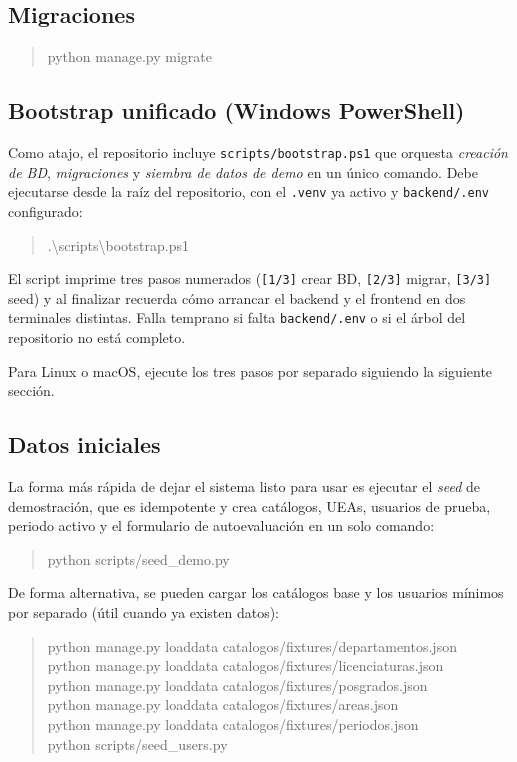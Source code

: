 \documentclass{computacion}
\begin{document}
\subsection{Migraciones}

\begin{quote}
\ttfamily
python manage.py migrate
\end{quote}

\subsection{Bootstrap unificado (Windows PowerShell)}

Como atajo, el repositorio incluye \texttt{scripts/bootstrap.ps1} que orquesta \emph{creación de BD}, \emph{migraciones} y \emph{siembra de datos de demo} en un único comando. Debe ejecutarse desde la raíz del repositorio, con el \texttt{.venv} ya activo y \texttt{backend/.env} configurado:

\begin{quote}
\ttfamily
.\textbackslash scripts\textbackslash bootstrap.ps1
\end{quote}

El script imprime tres pasos numerados (\texttt{[1/3]} crear BD, \texttt{[2/3]} migrar, \texttt{[3/3]} seed) y al finalizar recuerda cómo arrancar el backend y el frontend en dos terminales distintas. Falla temprano si falta \texttt{backend/.env} o si el árbol del repositorio no está completo.

Para Linux o macOS, ejecute los tres pasos por separado siguiendo la siguiente sección.

\subsection{Datos iniciales}

La forma más rápida de dejar el sistema listo para usar es ejecutar el \emph{seed} de demostración, que es idempotente y crea catálogos, UEAs, usuarios de prueba, periodo activo y el formulario de autoevaluación en un solo comando:

\begin{quote}
\ttfamily
python scripts/seed\_demo.py
\end{quote}

De forma alternativa, se pueden cargar los catálogos base y los usuarios mínimos por separado (útil cuando ya existen datos):

\begin{quote}
\ttfamily
python manage.py loaddata catalogos/fixtures/departamentos.json \\
python manage.py loaddata catalogos/fixtures/licenciaturas.json \\
python manage.py loaddata catalogos/fixtures/posgrados.json \\
python manage.py loaddata catalogos/fixtures/areas.json \\
python manage.py loaddata catalogos/fixtures/periodos.json \\
python scripts/seed\_users.py
\end{quote}
\end{document}
